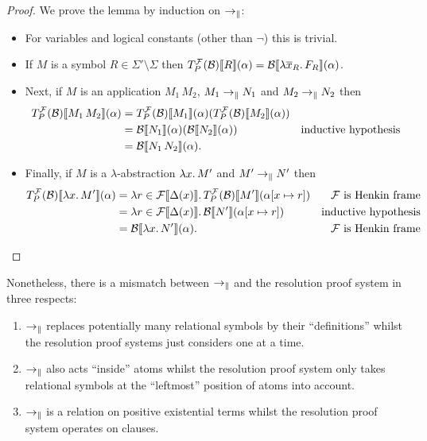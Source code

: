 \documentclass[a4paper,twoside,notitlepage,openright,11pt]{report}
\begin{document}
\begin{proof}
  We prove the lemma by induction on $\rightarrow_\parallel$:
  \begin{itemize}[noitemsep]
  \item For variables and logical constants (other than $\neg$) this is trivial.
  \item If $M$ is a symbol $R\in\Sigma'\setminus\Sigma$ then ${T^\mathcal F_P(\mathcal B)}\llbracket R\rrbracket(\alpha)={\mathcal B}\llbracket\lambda\overline x_R\ldotp F_R\rrbracket(\alpha)$.
  \item Next, if $M$ is an application $M_1\,M_2$, $M_1\rightarrow_\parallel N_1$ and $M_2\rightarrow_\parallel N_2$ then
    \begin{align*}
      {T^\mathcal F_P(\mathcal B)}\llbracket M_1\,M_2\rrbracket(\alpha)&={T^\mathcal F_P(\mathcal B)}\llbracket M_1\rrbracket(\alpha)({T^\mathcal F_P(\mathcal B)}\llbracket M_2\rrbracket(\alpha))\\
                                          &={\mathcal B}\llbracket N_1\rrbracket(\alpha)({\mathcal B}\llbracket N_2\rrbracket(\alpha))&\text{inductive hypothesis}\\
                                          &={\mathcal B}\llbracket N_1\,N_2\rrbracket(\alpha).
    \end{align*}
  \item Finally, if $M$ is a $\lambda$-abstraction $\lambda x\ldotp M'$ and $M'\rightarrow_\parallel N'$ then
    \begin{align*}
      {T^\mathcal F_P(\mathcal B)}\llbracket\lambda x\ldotp M'\rrbracket(\alpha)&=\lambda r\in{\mathcal F}\llbracket\Delta(x)\rrbracket\ldotp{T^\mathcal F_P(\mathcal B)}\llbracket M'\rrbracket(\alpha[x\mapsto r])&\text{$\mathcal F$ is Henkin frame}\\
                                                     &=\lambda r\in{\mathcal F}\llbracket\Delta(x)\rrbracket\ldotp{\mathcal B}\llbracket N'\rrbracket(\alpha[x\mapsto r])&\text{inductive hypothesis}\\
                                                     &={\mathcal B}\llbracket\lambda x\ldotp N'\rrbracket(\alpha).&\text{$\mathcal F$ is Henkin frame}
    \end{align*}
  \end{itemize}
\end{proof}
Nonetheless, there is a mismatch between $\rightarrow_\parallel$ and the resolution proof system in three respects:
\begin{enumerate}[label=\textbf{(M\arabic*)},leftmargin=2.5\parindent]
\item\label{it:mismatch1} $\rightarrow_\parallel$ replaces potentially many relational symbols by their ``definitions'' whilst the resolution proof systems just considers one at a time.
\item\label{it:mismatch2} $\rightarrow_\parallel$ also acts ``inside'' atoms whilst the resolution proof system only takes relational symbols at the ``leftmost'' position of atoms into account.
\item\label{it:mismatch3} $\rightarrow_\parallel$ is a relation on positive existential terms whilst the resolution proof system operates on clauses.
\end{enumerate}
\end{document}
